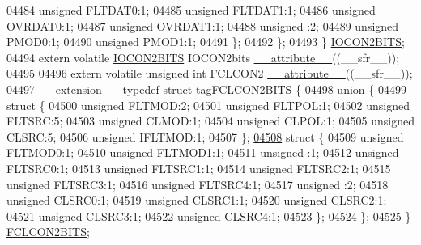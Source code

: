 \begin{DoxyCode}
04484       \textcolor{keywordtype}{unsigned} FLTDAT0:1;
04485       \textcolor{keywordtype}{unsigned} FLTDAT1:1;
04486       \textcolor{keywordtype}{unsigned} OVRDAT0:1;
04487       \textcolor{keywordtype}{unsigned} OVRDAT1:1;
04488       \textcolor{keywordtype}{unsigned} :2;
04489       \textcolor{keywordtype}{unsigned} PMOD0:1;
04490       \textcolor{keywordtype}{unsigned} PMOD1:1;
04491     \};
04492   \};
04493 \} \hyperlink{a00008_d1/d69/a00507}{IOCON2BITS};
04494 \textcolor{keyword}{extern} \textcolor{keyword}{volatile} \hyperlink{a00008_d1/d69/a00507}{IOCON2BITS} IOCON2bits \hyperlink{a00009_a493c46f03454991ccc5aa7a6e1dfb2a7}{\_\_attribute\_\_}((\_\_sfr\_\_));
04495 
04496 \textcolor{keyword}{extern} \textcolor{keyword}{volatile} \textcolor{keywordtype}{unsigned} \textcolor{keywordtype}{int}  FCLCON2 \hyperlink{a00009_a493c46f03454991ccc5aa7a6e1dfb2a7}{\_\_attribute\_\_}((\_\_sfr\_\_));
\hypertarget{a00009_source_l04497}{}\hyperlink{a00008}{04497} \_\_extension\_\_ \textcolor{keyword}{typedef} \textcolor{keyword}{struct }tagFCLCON2BITS \{
\hypertarget{a00009_source_l04498}{}\hyperlink{a00009}{04498}   \textcolor{keyword}{union }\{
\hypertarget{a00009_source_l04499}{}\hyperlink{a00009}{04499}     \textcolor{keyword}{struct }\{
04500       \textcolor{keywordtype}{unsigned} FLTMOD:2;
04501       \textcolor{keywordtype}{unsigned} FLTPOL:1;
04502       \textcolor{keywordtype}{unsigned} FLTSRC:5;
04503       \textcolor{keywordtype}{unsigned} CLMOD:1;
04504       \textcolor{keywordtype}{unsigned} CLPOL:1;
04505       \textcolor{keywordtype}{unsigned} CLSRC:5;
04506       \textcolor{keywordtype}{unsigned} IFLTMOD:1;
04507     \};
\hypertarget{a00009_source_l04508}{}\hyperlink{a00009}{04508}     \textcolor{keyword}{struct }\{
04509       \textcolor{keywordtype}{unsigned} FLTMOD0:1;
04510       \textcolor{keywordtype}{unsigned} FLTMOD1:1;
04511       \textcolor{keywordtype}{unsigned} :1;
04512       \textcolor{keywordtype}{unsigned} FLTSRC0:1;
04513       \textcolor{keywordtype}{unsigned} FLTSRC1:1;
04514       \textcolor{keywordtype}{unsigned} FLTSRC2:1;
04515       \textcolor{keywordtype}{unsigned} FLTSRC3:1;
04516       \textcolor{keywordtype}{unsigned} FLTSRC4:1;
04517       \textcolor{keywordtype}{unsigned} :2;
04518       \textcolor{keywordtype}{unsigned} CLSRC0:1;
04519       \textcolor{keywordtype}{unsigned} CLSRC1:1;
04520       \textcolor{keywordtype}{unsigned} CLSRC2:1;
04521       \textcolor{keywordtype}{unsigned} CLSRC3:1;
04522       \textcolor{keywordtype}{unsigned} CLSRC4:1;
04523     \};
04524   \};
04525 \} \hyperlink{a00008_de/df8/a00440}{FCLCON2BITS};

\end{DoxyCode}

